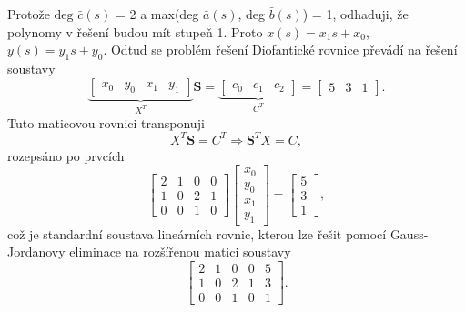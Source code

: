 \documentclass[twoside]{article}
\begin{document}
Protože $\text{deg }\bar{c}(s)$ = 2 a max(deg $\bar{a}(s)$, deg $\bar{b}(s)$) = 1, 
odhaduji, že polynomy v řešení budou mít stupeň 1. Proto $x(s) = x_1 s + x_0$,  $y(s) = y_1 s + y_0$.
Odtud se problém řešení Diofantické rovnice převádí na řešení soustavy
\begin{equation}
	\underbrace{
	\begin{bmatrix}
		x_0 & y_0 & x_1 & y_1
	\end{bmatrix}}_{X^T}
	\mathbf{S} = \underbrace{\begin{bmatrix}
		c_0 & c_1 & c_2 
	\end{bmatrix}}_{C^T} = \begin{bmatrix}
		5 & 3 & 1
	\end{bmatrix}.
\end{equation}
Tuto maticovou rovnici transponuji
\begin{equation}
	X^T \mathbf{S} = C^T \Rightarrow \mathbf{S}^T X = C,
\end{equation}
rozepsáno po prvcích
\begin{equation}
	\begin{bmatrix}
		2   & 1  &       0    &     0\\
		1   &      0  &  2    &1\\
			 0   &      0  &   1    &     0
	\end{bmatrix} \begin{bmatrix}
		x_0 \\ y_0 \\ x_1 \\ y_1
	\end{bmatrix} = \begin{bmatrix}
		5 \\ 3 \\ 1 
	\end{bmatrix},
\end{equation}
což je standardní soustava lineárních rovnic, kterou lze řešit pomocí Gauss-Jordanovy eliminace
na rozšířenou matici soustavy
	\begin{equation}
\left[
\begin{array}{cccc|c}
	2 & 1 & 0 & 0 & 5\\
	1 & 0 & 2 & 1 & 3\\
	0 & 0 & 1 & 0 & 1
\end{array}
\right].
\end{equation}
\end{document}
